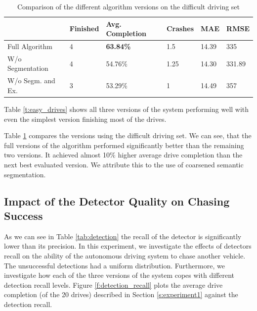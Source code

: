 \documentclass{ctuthesis/ctuthesis}
\begin{document}
\begin{table}[]
\tabcolsep=0.11cm
\begin{tabular}{l|lllll}
\hline
                                       & Finished & Avg. Completion & Crashes & MAE   & RMSE   \\ \hline
Full Algorithm                         & 4               & \textbf{63.84\%}         & 1.5     & 14.39 & 335    \\
W/o Segmentation                   & 4               & 54.76\%                  & 1.25    & 14.30 & 331.89 \\
W/o Segm. and Ex. & 3               & 53.29\%                  & 1       & 14.49 & 357    \\ \hline
\end{tabular}
\caption{Comparison of the different algorithm versions on the difficult driving set}\label{t:difficult_drives}
\end{table}

Table \ref{t:easy_drives} shows all three versions of the system performing well with even the simplest version finishing most of the drives. \par
Table \ref{t:difficult_drives} compares the versions using the difficult driving set. We can see, that the full versions of the algorithm performed significantly better than the remaining two versions. It achieved almost 10\% higher average drive completion than the next best evaluated version. We attribute this to the use of coarsened semantic segmentation. \par






\subsection{Impact of the Detector Quality on Chasing Success}
As we can see in Table \ref{tab:detection} the recall of the detector is significantly lower than its precision. In this experiment, we investigate the effects of detectors recall on the ability of the autonomous driving system to chase another vehicle. The unsuccessful detections had a uniform distribution. Furthermore, we investigate how each of the three versions of the system copes with different detection recall levels. Figure \ref{f:detection_recall} plots the average drive completion (of the 20 drives) described in Section \ref{s:experiment1} against the detection recall. \par
\end{document}
